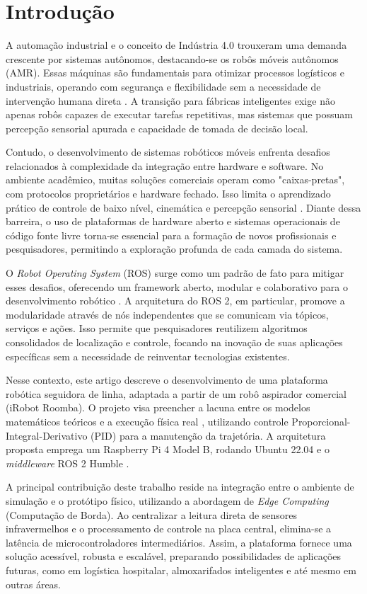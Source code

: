 \chapter{Introdução}

A automação industrial e o conceito de Indústria 4.0 trouxeram uma demanda crescente por sistemas autônomos, destacando-se os robôs móveis autônomos (AMR). Essas máquinas são fundamentais para otimizar processos logísticos e industriais, operando com segurança e flexibilidade sem a necessidade de intervenção humana direta \cite{Anand_2024_intro, IFR2025, braun2022robot}. A transição para fábricas inteligentes exige não apenas robôs capazes de executar tarefas repetitivas, mas sistemas que possuam percepção sensorial apurada e capacidade de tomada de decisão local. 

Contudo, o desenvolvimento de sistemas robóticos móveis enfrenta desafios relacionados à complexidade da integração entre hardware e software. No ambiente acadêmico, muitas soluções comerciais operam como "caixas-pretas", com protocolos proprietários e hardware fechado. Isso limita o aprendizado prático de controle de baixo nível, cinemática e percepção sensorial \cite{patel2023open, jolles2022open}. Diante dessa barreira, o uso de plataformas de hardware aberto e sistemas operacionais de código fonte livre torna-se essencial para a formação de novos profissionais e pesquisadores, permitindo a exploração profunda de cada camada do sistema.

O \textit{Robot Operating System} (ROS) surge como um padrão de fato para mitigar esses desafios, oferecendo um framework aberto, modular e colaborativo para o desenvolvimento robótico \cite{macenski2022robot}. A arquitetura do ROS 2, em particular, promove a modularidade através de nós independentes que se comunicam via tópicos, serviços e ações. Isso permite que pesquisadores reutilizem algoritmos consolidados de localização e controle, focando na inovação de suas aplicações específicas sem a necessidade de reinventar tecnologias existentes.

Nesse contexto, este artigo descreve o desenvolvimento de uma plataforma robótica seguidora de linha, adaptada a partir de um robô aspirador comercial (iRobot Roomba). O projeto visa preencher a lacuna entre os modelos matemáticos teóricos e a execução física real \cite{vega2025bridging}, utilizando controle Proporcional-Integral-Derivativo (PID) para a manutenção da trajetória. A arquitetura proposta emprega um Raspberry Pi 4 Model B, rodando Ubuntu 22.04 e o \textit{middleware} ROS 2 Humble \cite{kortelainen2023short}. 

A principal contribuição deste trabalho reside na integração entre o ambiente de simulação e o protótipo físico, utilizando a abordagem de \textit{Edge Computing} (Computação de Borda). Ao centralizar a leitura direta de sensores infravermelhos e o processamento de controle na placa central, elimina-se a latência de microcontroladores intermediários. Assim, a plataforma fornece uma solução acessível, robusta e escalável, preparando possibilidades de aplicações futuras, como em logística hospitalar, almoxarifados inteligentes e até mesmo em outras áreas.